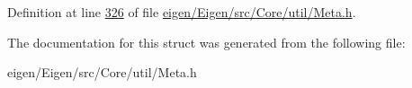 Definition at line \hyperlink{eigen_2_eigen_2src_2_core_2util_2_meta_8h_source_l00326}{326} of file \hyperlink{eigen_2_eigen_2src_2_core_2util_2_meta_8h_source}{eigen/\+Eigen/src/\+Core/util/\+Meta.\+h}.



The documentation for this struct was generated from the following file\+:\begin{DoxyCompactItemize}
\item 
eigen/\+Eigen/src/\+Core/util/\+Meta.\+h\end{DoxyCompactItemize}

